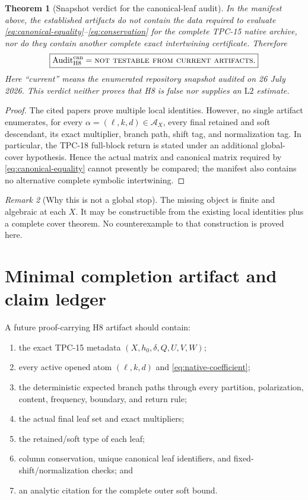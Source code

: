 \documentclass[11pt,a4paper]{article}
\newtheorem{theorem}{Theorem}[section]
\theoremstyle{definition}
\theoremstyle{remark}
\newtheorem{remark}[theorem]{Remark}
\newcommand{\cA}{\mathcal A}
\newcommand{\Ltwo}{\mathrm{L2}}
\begin{document}
\begin{theorem}[Snapshot verdict for the canonical-leaf audit]
\label{thm:verdict}
In the manifest above, the established artifacts do not contain the data required to evaluate
\eqref{eq:canonical-equality}--\eqref{eq:conservation} for the complete
TPC-15 native archive, nor do they contain another complete exact
intertwining certificate.  Therefore
\[
 \boxed{
 \operatorname{Audit}^{\rm can}_{\mathrm{H8}}
 =
 \textnormal{\textsc{not testable from current artifacts}}.}
\]
Here ``current'' means the enumerated repository snapshot audited on
26 July 2026.  This verdict neither proves that H8 is false nor
supplies an \(\Ltwo\) estimate.
\end{theorem}

\begin{proof}
The cited papers prove multiple local identities.  However, no single
artifact enumerates, for every \(\alpha=(\ell,k,d)\in\cA_X\), every
final retained and soft descendant, its exact multiplier, branch path,
shift tag, and normalization tag.  In particular, the TPC-18
full-block return is stated under an additional global-cover
hypothesis.  Hence the actual matrix and canonical matrix required by
\eqref{eq:canonical-equality} cannot presently be compared; the
manifest also contains no alternative complete symbolic
intertwining.
\end{proof}

\begin{remark}[Why this is not a global stop]
The missing object is finite and algebraic at each \(X\).  It may be
constructible from the existing local identities plus a complete cover
theorem.  No counterexample to that construction is proved here.
\end{remark}

\section{Minimal completion artifact and claim ledger}

A future proof-carrying H8 artifact should contain:
\begin{enumerate}[label=\textbf{R\arabic*.},leftmargin=2.7em]
\item the exact TPC-15 metadata
\((X,h_0,\delta,Q,U,V,W)\);
\item every active opened atom \((\ell,k,d)\) and
\eqref{eq:native-coefficient};
\item the deterministic expected branch paths through every partition,
polarization, content, frequency, boundary, and return rule;
\item the actual final leaf set and exact multipliers;
\item the retained/soft type of each leaf;
\item column conservation, unique canonical leaf identifiers, and
fixed-shift/normalization checks; and
\item an analytic citation for the complete outer soft bound.
\end{enumerate}
\end{document}
